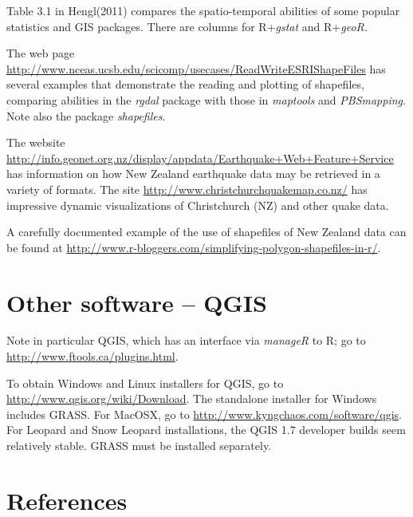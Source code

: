 \documentclass{tufte-book}\usepackage[]{graphicx}\usepackage[]{color}
\begin{document}
{Table 3.1 in Hengl(2011) compares the
  spatio-temporal abilities of some popular statistics and GIS
  packages.  There are columns for R+{\em gstat} and R+{\em geoR.}

The web page
\url{http://www.nceas.ucsb.edu/scicomp/usecases/ReadWriteESRIShapeFiles}
has several examples that demonstrate the reading and plotting of
shapefiles, comparing abilities in the {\em rgdal} package with those
in {\em maptools} and {\em PBSmapping}. Note also the package
{\em shapefiles}.

The website
\url{http://info.geonet.org.nz/display/appdata/Earthquake+Web+Feature+Service}
has information on how New Zealand earthquake data may be retrieved in
a variety of formats.
The site \url{http://www.christchurchquakemap.co.nz/} has impressive
dynamic visualizations of Christchurch (NZ) and other quake data.

A carefully documented example of the use of shapefiles of New Zealand
data can be found at\newline
\noindent
\url{http://www.r-bloggers.com/simplifying-polygon-shapefiles-in-r/}.
}
\section{Other software -- QGIS}
Note in particular QGIS, which has an interface via {\em manageR} to
R; go to \url{http://www.ftools.ca/plugins.html}.

To obtain Windows and Linux installers for QGIS, go to
\url{http://www.qgis.org/wiki/Download}.  The standalone installer for
Windows includes GRASS.  For MacOSX, go to
\url{http://www.kyngchaos.com/software/qgis}.  For Leopard and Snow Leopard
installations, the QGIS 1.7 developer builds seem relatively stable.
GRASS must be installed separately.

\section{References}
\end{document}
